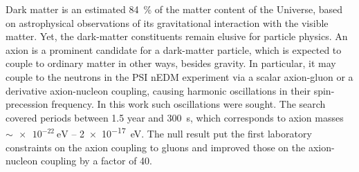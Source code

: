 Dark matter is an estimated \SI{84}{\percent} of the matter content of the Universe, based on astrophysical observations of its gravitational interaction with the visible matter.
Yet, the dark-matter constituents remain elusive for particle physics.
An axion is a prominent candidate for a dark-matter particle, which is expected to couple to ordinary matter in other ways, besides gravity.
In particular, it may couple to the neutrons in the PSI nEDM experiment via a scalar axion-gluon or a derivative axion-nucleon coupling, causing harmonic oscillations in their spin-precession frequency.
In this work such oscillations were sought.
The search covered periods between \num{1.5} year and \SI{300}{\second}, which corresponds to axion masses $\sim \SI{e-22}{\electronvolt}$ -- \SI{2e-17}{\electronvolt}.
The null result put the first laboratory constraints on the axion coupling to gluons and improved those on the axion-nucleon coupling by a factor of 40.

\enlargethispage{2\baselineskip}

\endgroup			

\vfill
